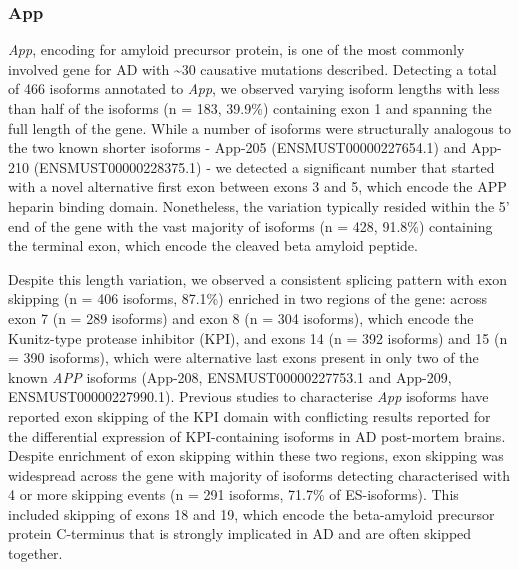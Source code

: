 \subsubsection{App}
\textit{App}, encoding for amyloid precursor protein, is one of the most commonly involved gene for AD with \textasciitilde30 causative mutations described. Detecting a total of 466 isoforms annotated to \textit{App}, we observed varying isoform lengths with less than half of the isoforms (n = 183, 39.9\%) containing exon 1 and spanning the full length of the gene. While a number of isoforms were structurally analogous to the two known shorter isoforms - App-205 (ENSMUST00000227654.1) and App-210 (ENSMUST00000228375.1) - we detected a significant number that started with a novel alternative first exon between exons 3 and 5, which encode the APP heparin binding domain. Nonetheless, the variation typically resided within the 5' end of the gene with the vast majority of isoforms (n = 428, 91.8\%) containing the terminal exon, which encode the cleaved beta amyloid peptide. 

Despite this length variation, we observed a consistent splicing pattern with exon skipping (n = 406 isoforms, 87.1\%) enriched in two regions of the gene: across exon 7 (n = 289 isoforms) and exon 8 (n = 304 isoforms), which encode the Kunitz-type protease inhibitor (KPI), and exons 14 (n = 392 isoforms) and 15 (n = 390 isoforms), which were alternative last exons present in only two of the known \textit{APP} isoforms (App-208, ENSMUST00000227753.1 and App-209, ENSMUST00000227990.1). Previous studies to characterise \textit{App} isoforms have reported exon skipping of the KPI domain with conflicting results reported for the differential expression of KPI-containing isoforms in AD post-mortem brains. Despite enrichment of exon skipping within these two regions, exon skipping was widespread across the gene with majority of isoforms detecting characterised with 4 or more skipping events (n = 291 isoforms, 71.7\% of ES-isoforms). This included skipping of exons 18 and 19, which encode the beta-amyloid precursor protein C-terminus that is strongly implicated in AD and are often skipped together.   


